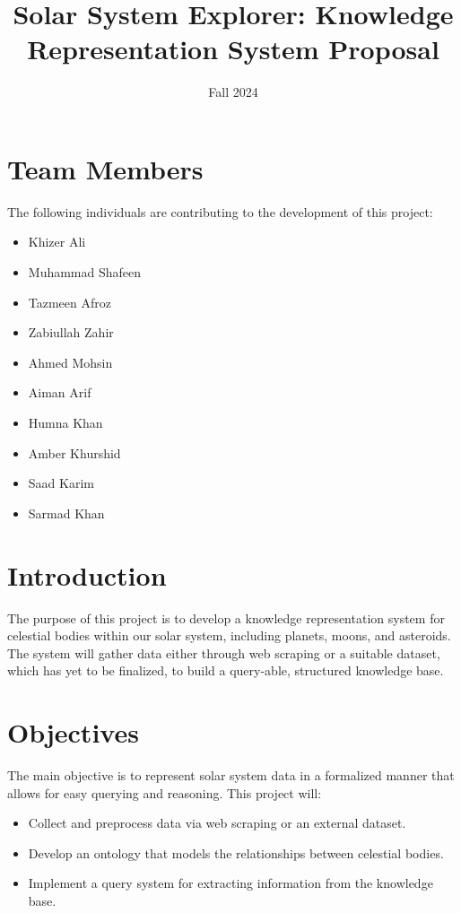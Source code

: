 \documentclass{article}
\title{Solar System Explorer: Knowledge Representation System Proposal}
\author{}
\date{Fall 2024}
\begin{document}
\maketitle

\section{Team Members}
The following individuals are contributing to the development of this project:
\begin{itemize}
    \item Khizer Ali
    \item Muhammad Shafeen
    \item Tazmeen Afroz
    \item Zabiullah Zahir
    \item Ahmed Mohsin
    \item Aiman Arif
    \item Humna Khan
    \item Amber Khurshid
    \item Saad Karim
    \item Sarmad Khan
\end{itemize}

\section{Introduction}
The purpose of this project is to develop a knowledge representation system for celestial bodies within our solar system, including planets, moons, and asteroids. The system will gather data either through web scraping or a suitable dataset, which has yet to be finalized, to build a query-able, structured knowledge base.

\section{Objectives}
The main objective is to represent solar system data in a formalized manner that allows for easy querying and reasoning. This project will:
\begin{itemize}
    \item Collect and preprocess data via web scraping or an external dataset.
    \item Develop an ontology that models the relationships between celestial bodies.
    \item Implement a query system for extracting information from the knowledge base.
\end{itemize}
\end{document}
